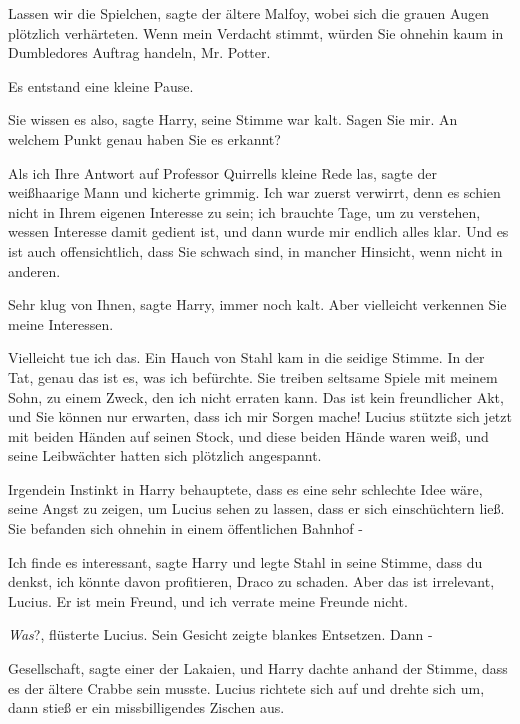 \glqq{}Lassen wir die Spielchen\grqq{}, sagte der ältere Malfoy, wobei sich die
grauen Augen plötzlich verhärteten. \glqq{}Wenn mein Verdacht stimmt, würden Sie
ohnehin kaum in Dumbledores Auftrag handeln, Mr. Potter.\grqq{}

Es entstand eine kleine Pause.

\glqq{}Sie wissen es also\grqq{}, sagte Harry, seine Stimme war kalt.
\glqq{}Sagen Sie mir. An welchem Punkt genau haben Sie es erkannt?\grqq{}

\glqq{}Als ich Ihre Antwort auf Professor Quirrells kleine Rede las\grqq{},
sagte der weißhaarige Mann und kicherte grimmig. \glqq{}Ich war zuerst verwirrt,
denn es schien nicht in Ihrem eigenen Interesse zu sein; ich brauchte Tage, um
zu verstehen, wessen Interesse damit gedient ist, und dann wurde mir endlich
alles klar. Und es ist auch offensichtlich, dass Sie schwach sind, in mancher
Hinsicht, wenn nicht in anderen.\grqq{}

\glqq{}Sehr klug von Ihnen\grqq{}, sagte Harry, immer noch kalt. \glqq{}Aber
vielleicht verkennen Sie meine Interessen.\grqq{}

\glqq{}Vielleicht tue ich das.\grqq{} Ein Hauch von Stahl kam in die seidige Stimme.
\glqq{}In der Tat, genau das ist es, was ich befürchte. Sie treiben seltsame
Spiele mit meinem Sohn, zu einem Zweck, den ich nicht erraten kann. Das ist kein
freundlicher Akt, und Sie können nur erwarten, dass ich mir Sorgen mache!\grqq{}
Lucius stützte sich jetzt mit beiden Händen auf seinen Stock, und diese beiden
Hände waren weiß, und seine Leibwächter hatten sich plötzlich angespannt.

Irgendein Instinkt in Harry behauptete, dass es eine sehr schlechte Idee wäre,
seine Angst zu zeigen, um Lucius sehen zu lassen, dass er sich einschüchtern
ließ. Sie befanden sich ohnehin in einem öffentlichen Bahnhof -

\glqq{}Ich finde es interessant\grqq{}, sagte Harry und legte Stahl in seine
Stimme, \glqq{}dass du denkst, ich könnte davon profitieren, Draco zu schaden.
Aber das ist irrelevant, Lucius. Er ist mein Freund, und ich verrate meine
Freunde nicht.\grqq{}

\glqq{}\emph{Was}?\grqq{}, flüsterte Lucius. Sein Gesicht zeigte blankes
Entsetzen. Dann -

\glqq{}Gesellschaft\grqq{}, sagte einer der Lakaien, und Harry dachte anhand der
Stimme, dass es der ältere Crabbe sein musste. Lucius richtete sich auf und
drehte sich um, dann stieß er ein missbilligendes Zischen aus.

